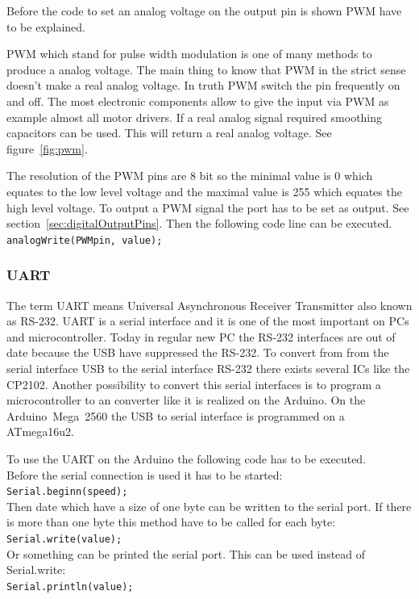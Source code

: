 Before the code to set an analog voltage on the output pin is shown PWM have to be explained.

PWM which stand for pulse width modulation is one of many methods to produce a analog voltage.
The main thing to know that PWM in the strict sense doesn't make a real analog voltage.
In truth PWM switch the pin frequently on and off. 
The most electronic components allow to give the input via PWM as example almost all motor drivers.
If a real analog signal required smoothing capacitors can be used.
This will return a real analog voltage.
See figure~\ref{fig:pwm}.

The resolution of the PWM pins are 8 bit so the minimal value is 0 which equates to the low level voltage and the maximal value is 255 which equates the high level voltage. 
To output a PWM signal the port has to be set as output. See section~\ref{sec:digitalOutputPins}.
Then the following code line can be executed.\\
\lstinline|analogWrite(PWMpin, value);|


\subsubsection{UART}\label{sec:uart}
The term UART means Universal Asynchronous Receiver Transmitter also known as RS-232.
UART is a serial interface and it is one of the most important on PCs and microcontroller.
Today in regular new PC the RS-232 interfaces are out of date because the USB have suppressed the RS-232.
To convert from from the serial interface USB to the serial interface RS-232 there exists several ICs like the CP2102.
Another possibility to convert this serial interfaces is to program a microcontroller to an converter like it is realized on the Arduino.
On the Arduino~Mega~2560 the USB to serial interface is programmed on a ATmega16u2.

To use the UART on the Arduino the following code has to be executed.\\
Before the serial connection is used it has to be started: \\
\lstinline|Serial.beginn(speed);| \\
Then date which have a size of one byte can be written to the serial port.
If there is more than one byte this method have to be called for each byte: \\
\lstinline|Serial.write(value);| \\
Or something can be printed the serial port. 
This can be used instead of Serial.write:\\
\lstinline|Serial.println(value);| \\

